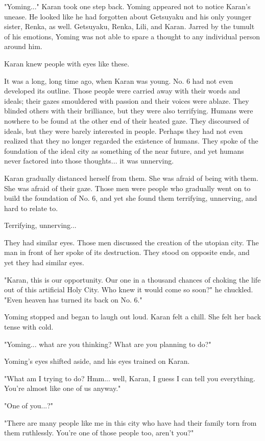 "Yoming..." Karan took one step back. Yoming appeared not to notice
Karan's unease. He looked like he had forgotten about Getsuyaku and his
only younger sister, Renka, as well. Getsuyaku, Renka, Lili, and Karan.
Jarred by the tumult of his emotions, Yoming was not able to spare a
thought to any individual person around him.

Karan knew people with eyes like these.

It was a long, long time ago, when Karan was young. No. 6 had not even
developed its outline. Those people were carried away with their words
and ideals; their gazes smouldered with passion and their voices were
ablaze. They blinded others with their brilliance, but they were also
terrifying. Humans were nowhere to be found at the other end of their
heated gaze. They discoursed of ideals, but they were barely interested
in people. Perhaps they had not even realized that they no longer
regarded the existence of humans. They spoke of the foundation of the
ideal city as something of the near future, and yet humans never
factored into those thoughts... it was unnerving.

Karan gradually distanced herself from them. She was afraid of being
with them. She was afraid of their gaze. Those men were people who
gradually went on to build the foundation of No. 6, and yet she found
them terrifying, unnerving, and hard to relate to.

Terrifying, unnerving...

They had similar eyes. Those men discussed the creation of the utopian
city. The man in front of her spoke of its destruction. They stood on
opposite ends, and yet they had similar eyes.

"Karan, this is our opportunity. Our one in a thousand chances of
choking the life out of this artificial Holy City. Who knew it would
come so soon?" he chuckled. "Even heaven has turned its back on No. 6."

Yoming stopped and began to laugh out loud. Karan felt a chill. She felt
her back tense with cold.

"Yoming... what are you thinking? What are you planning to do?"

Yoming's eyes shifted aside, and his eyes trained on Karan.

"What am I trying to do? Hmm... well, Karan, I guess I can tell you
everything. You're almost like one of us anyway."

"One of you...?"

"There are many people like me in this city who have had their family
torn from them ruthlessly. You're one of those people too, aren't you?"

